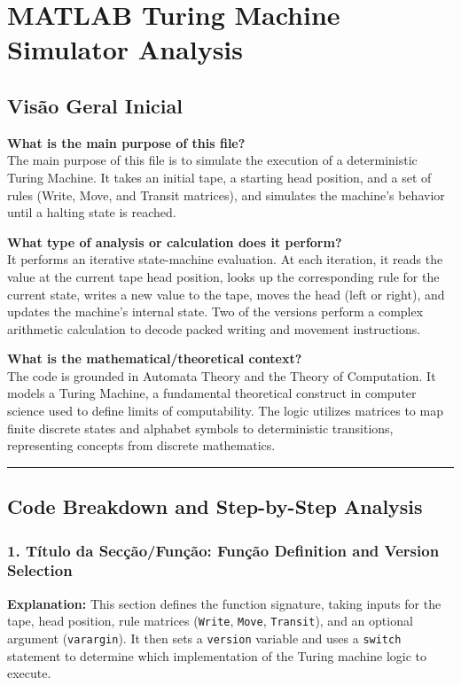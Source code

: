 
\chapter{MATLAB Turing Machine Simulator Analysis}
\section*{Visão Geral Inicial}

\textbf{What is the main purpose of this file?}\\
The main purpose of this file is to simulate the execution of a deterministic Turing Machine. It takes an initial tape, a starting head position, and a set of rules (Write, Move, and Transit matrices), and simulates the machine's behavior until a halting state is reached.

\textbf{What type of analysis or calculation does it perform?}\\
It performs an iterative state-machine evaluation. At each iteration, it reads the value at the current tape head position, looks up the corresponding rule for the current state, writes a new value to the tape, moves the head (left or right), and updates the machine's internal state. Two of the versions perform a complex arithmetic calculation to decode packed writing and movement instructions.

\textbf{What is the mathematical/theoretical context?}\\
The code is grounded in Automata Theory and the Theory of Computation. It models a Turing Machine, a fundamental theoretical construct in computer science used to define limits of computability. The logic utilizes matrices to map finite discrete states and alphabet symbols to deterministic transitions, representing concepts from discrete mathematics.

\vspace{1em}
\hrule
\vspace{1em}

\section*{Code Breakdown and Step-by-Step Analysis}

\subsection*{1. Título da Secção/Função: Função Definition and Version Selection}
\textbf{Explanation:} This section defines the function signature, taking inputs for the tape, head position, rule matrices (\texttt{Write}, \texttt{Move}, \texttt{Transit}), and an optional argument (\texttt{varargin}). It then sets a \texttt{version} variable and uses a \texttt{switch} statement to determine which implementation of the Turing machine logic to execute.

